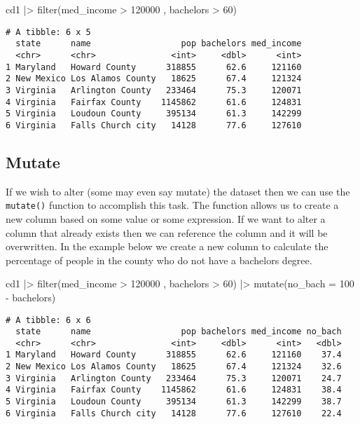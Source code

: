 \documentclass[
  letterpaper,
  DIV=11,
  numbers=noendperiod]{scrreprt}
\newenvironment{Shaded}{\begin{snugshade}}{\end{snugshade}}
\newcommand{\AttributeTok}[1]{\textcolor[rgb]{0.40,0.45,0.13}{#1}}
\newcommand{\DecValTok}[1]{\textcolor[rgb]{0.68,0.00,0.00}{#1}}
\newcommand{\FunctionTok}[1]{\textcolor[rgb]{0.28,0.35,0.67}{#1}}
\newcommand{\NormalTok}[1]{\textcolor[rgb]{0.00,0.23,0.31}{#1}}
\newcommand{\SpecialCharTok}[1]{\textcolor[rgb]{0.37,0.37,0.37}{#1}}
\begin{document}
\begin{Shaded}
\begin{Highlighting}[]
\NormalTok{cd1 }\SpecialCharTok{|\textgreater{}} \FunctionTok{filter}\NormalTok{(med\_income }\SpecialCharTok{\textgreater{}} \DecValTok{120000}\NormalTok{ , bachelors }\SpecialCharTok{\textgreater{}} \DecValTok{60}\NormalTok{)}
\end{Highlighting}
\end{Shaded}

\begin{verbatim}
# A tibble: 6 x 5
  state      name                  pop bachelors med_income
  <chr>      <chr>               <int>     <dbl>      <int>
1 Maryland   Howard County      318855      62.6     121160
2 New Mexico Los Alamos County   18625      67.4     121324
3 Virginia   Arlington County   233464      75.3     120071
4 Virginia   Fairfax County    1145862      61.6     124831
5 Virginia   Loudoun County     395134      61.3     142299
6 Virginia   Falls Church city   14128      77.6     127610
\end{verbatim}

\subsection{Mutate}\label{mutate}

If we wish to alter (some may even say mutate) the dataset then we can
use the \texttt{mutate()} function to accomplish this task. The function
allows us to create a new column based on some value or some expression.
If we want to alter a column that already exists then we can reference
the column and it will be overwritten. In the example below we create a
new column to calculate the percentage of people in the county who do
not have a bachelors degree.

\begin{Shaded}
\begin{Highlighting}[]
\NormalTok{cd1 }\SpecialCharTok{|\textgreater{}} \FunctionTok{filter}\NormalTok{(med\_income }\SpecialCharTok{\textgreater{}} \DecValTok{120000}\NormalTok{ , bachelors }\SpecialCharTok{\textgreater{}} \DecValTok{60}\NormalTok{) }\SpecialCharTok{|\textgreater{}}
    \FunctionTok{mutate}\NormalTok{(}\AttributeTok{no\_bach =} \DecValTok{100} \SpecialCharTok{{-}}\NormalTok{ bachelors)}
\end{Highlighting}
\end{Shaded}

\begin{verbatim}
# A tibble: 6 x 6
  state      name                  pop bachelors med_income no_bach
  <chr>      <chr>               <int>     <dbl>      <int>   <dbl>
1 Maryland   Howard County      318855      62.6     121160    37.4
2 New Mexico Los Alamos County   18625      67.4     121324    32.6
3 Virginia   Arlington County   233464      75.3     120071    24.7
4 Virginia   Fairfax County    1145862      61.6     124831    38.4
5 Virginia   Loudoun County     395134      61.3     142299    38.7
6 Virginia   Falls Church city   14128      77.6     127610    22.4
\end{verbatim}
\end{document}
